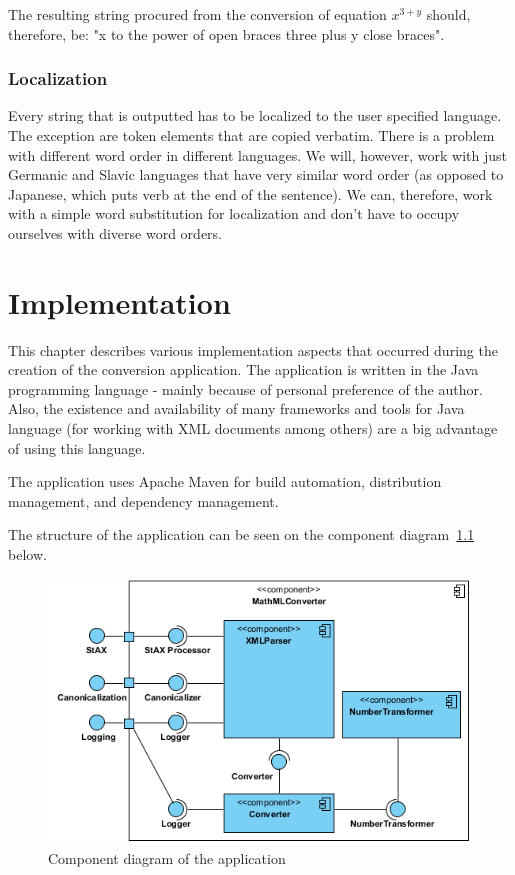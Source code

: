 \documentclass[11pt,oneside,final]{fithesis2}
\begin{document}
The resulting string procured from the conversion of equation $x^{3+y}$ should, therefore, be: "x to the power of open braces three plus y close braces".

\subsection{Localization}
Every string  that is outputted has to be localized to the user specified language. The exception are token elements that are copied verbatim. There is a problem with different word order in different languages. We will, however, work with just Germanic and Slavic languages that have very similar word order (as opposed to Japanese, which puts verb at the end of the sentence). We can, therefore, work with a simple word substitution for localization and don't have to occupy ourselves with diverse word orders.

\chapter{Implementation}
This chapter describes various implementation aspects that occurred during the creation of the conversion application. The application is written in the Java programming language - mainly because of personal preference of the author. Also, the existence and availability of many frameworks and tools for Java language (for working with XML documents among others) are a big advantage of using this language. 

The application uses Apache Maven for build automation, distribution management, and dependency management.

The structure of the application can be seen on the component diagram~\ref{fig:componentdiagram} below.

\begin{figure}[!ht]
\centering
\includegraphics[width=\textwidth]{component_diagram}
\caption{Component diagram of the application}
\label{fig:componentdiagram}
\end{figure}
\end{document}
